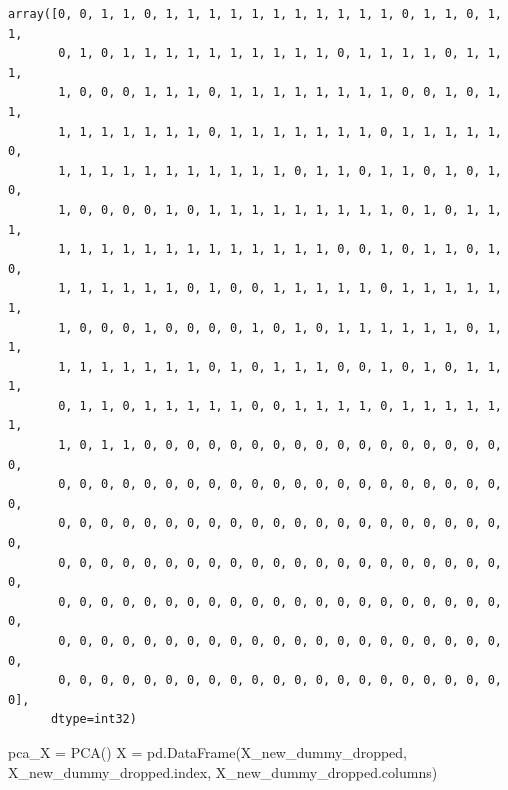 \documentclass[
  11pt,
  letterpaper,
  DIV=11,
  numbers=noendperiod]{scrartcl}
\newenvironment{Shaded}{\begin{snugshade}}{\end{snugshade}}
\newcommand{\NormalTok}[1]{\textcolor[rgb]{0.00,0.23,0.31}{#1}}
\newcommand{\OperatorTok}[1]{\textcolor[rgb]{0.37,0.37,0.37}{#1}}
\begin{document}
\begin{verbatim}
array([0, 0, 1, 1, 0, 1, 1, 1, 1, 1, 1, 1, 1, 1, 1, 1, 0, 1, 1, 0, 1, 1,
       0, 1, 0, 1, 1, 1, 1, 1, 1, 1, 1, 1, 1, 0, 1, 1, 1, 1, 0, 1, 1, 1,
       1, 0, 0, 0, 1, 1, 1, 0, 1, 1, 1, 1, 1, 1, 1, 1, 0, 0, 1, 0, 1, 1,
       1, 1, 1, 1, 1, 1, 1, 0, 1, 1, 1, 1, 1, 1, 1, 0, 1, 1, 1, 1, 1, 0,
       1, 1, 1, 1, 1, 1, 1, 1, 1, 1, 1, 0, 1, 1, 0, 1, 1, 0, 1, 0, 1, 0,
       1, 0, 0, 0, 0, 1, 0, 1, 1, 1, 1, 1, 1, 1, 1, 1, 0, 1, 0, 1, 1, 1,
       1, 1, 1, 1, 1, 1, 1, 1, 1, 1, 1, 1, 1, 0, 0, 1, 0, 1, 1, 0, 1, 0,
       1, 1, 1, 1, 1, 1, 0, 1, 0, 0, 1, 1, 1, 1, 1, 0, 1, 1, 1, 1, 1, 1,
       1, 0, 0, 0, 1, 0, 0, 0, 0, 1, 0, 1, 0, 1, 1, 1, 1, 1, 1, 0, 1, 1,
       1, 1, 1, 1, 1, 1, 1, 0, 1, 0, 1, 1, 1, 0, 0, 1, 0, 1, 0, 1, 1, 1,
       0, 1, 1, 0, 1, 1, 1, 1, 1, 0, 0, 1, 1, 1, 1, 0, 1, 1, 1, 1, 1, 1,
       1, 0, 1, 1, 0, 0, 0, 0, 0, 0, 0, 0, 0, 0, 0, 0, 0, 0, 0, 0, 0, 0,
       0, 0, 0, 0, 0, 0, 0, 0, 0, 0, 0, 0, 0, 0, 0, 0, 0, 0, 0, 0, 0, 0,
       0, 0, 0, 0, 0, 0, 0, 0, 0, 0, 0, 0, 0, 0, 0, 0, 0, 0, 0, 0, 0, 0,
       0, 0, 0, 0, 0, 0, 0, 0, 0, 0, 0, 0, 0, 0, 0, 0, 0, 0, 0, 0, 0, 0,
       0, 0, 0, 0, 0, 0, 0, 0, 0, 0, 0, 0, 0, 0, 0, 0, 0, 0, 0, 0, 0, 0,
       0, 0, 0, 0, 0, 0, 0, 0, 0, 0, 0, 0, 0, 0, 0, 0, 0, 0, 0, 0, 0, 0,
       0, 0, 0, 0, 0, 0, 0, 0, 0, 0, 0, 0, 0, 0, 0, 0, 0, 0, 0, 0, 0, 0],
      dtype=int32)
\end{verbatim}

\begin{Shaded}
\begin{Highlighting}[]
\NormalTok{pca\_X }\OperatorTok{=}\NormalTok{ PCA()}
\NormalTok{X }\OperatorTok{=}\NormalTok{ pd.DataFrame(X\_new\_dummy\_dropped, X\_new\_dummy\_dropped.index, X\_new\_dummy\_dropped.columns)}
\end{Highlighting}
\end{Shaded}
\end{document}
